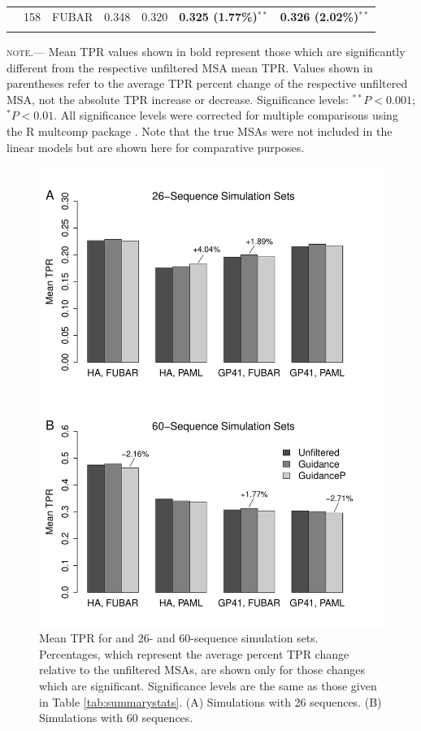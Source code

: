 \documentclass[11pt]{article}
\begin{document}
\begin{table}[htbp]
\begin{adjustwidth}{-0.75cm}{}
\begin{tabular}{l l l c c c c}
 & 158 & FUBAR & 0.348 & 0.320 & \textbf{0.325 (1.77\%)$^{\ast\ast}$} & \textbf{0.326 (2.02\%)$^{\ast\ast}$}\\
\noalign{\smallskip}\hline\noalign{\smallskip}
\end{tabular}
\newline
\textsc{note.}--- Mean TPR values shown in bold represent those which are significantly different from the respective unfiltered MSA mean TPR. Values shown in parentheses refer to the average TPR percent change of the respective unfiltered MSA, not the absolute TPR increase or decrease. Significance levels:  $^{\ast\ast} P < 0.001$; $^{\ast} P < 0.01$. All significance levels were corrected for multiple comparisons using the R multcomp package \citep{Hothorn2008}. Note that the true MSAs were not included in the linear models but are shown here for comparative purposes.
\end{adjustwidth}
\end{table}

\begin{figure}[H]
\centerline{\includegraphics[width=4.75in]{Figures/barplot.pdf}}
\caption{\label{barplot} Mean TPR for and 26- and  60-sequence simulation sets. Percentages, which represent the average percent TPR change relative to the unfiltered MSAs, are shown only for those changes which are significant. Significance levels are the same as those given in Table \ref{tab:summarystats}. (A) Simulations with 26 sequences. (B) Simulations with 60 sequences.}
\end{figure}
\end{document}
